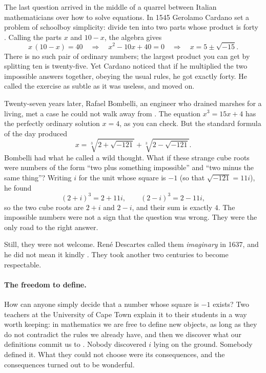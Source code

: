 
The last question arrived in the middle of a quarrel between Italian mathematicians over how to solve equations. In 1545 Gerolamo Cardano set a problem of schoolboy simplicity: divide ten into two parts whose product is forty \citep{Cardano1545}. Calling the parts $x$ and $10 - x$, the algebra gives
\[
x\,(10 - x) = 40 \quad\Longrightarrow\quad x^2 - 10x + 40 = 0 \quad\Longrightarrow\quad x = 5 \pm \sqrt{-15}.
\]
There is no such pair of ordinary numbers; the largest product you can get by splitting ten is twenty-five. Yet Cardano noticed that if he multiplied the two impossible answers together, obeying the usual rules, he got exactly forty. He called the exercise as subtle as it was useless, and moved on.

Twenty-seven years later, Rafael Bombelli, an engineer who drained marshes for a living, met a case he could not walk away from \citep{Bombelli1572}. The equation $x^3 = 15x + 4$ has the perfectly ordinary solution $x = 4$, as you can check. But the standard formula of the day produced
\[
x = \sqrt[3]{2 + \sqrt{-121}} + \sqrt[3]{2 - \sqrt{-121}} .
\]
Bombelli had what he called a wild thought. What if these strange cube roots were numbers of the form ``two plus something impossible'' and ``two minus the same thing''? Writing $i$ for the unit whose square is $-1$ (so that $\sqrt{-121} = 11i$), he found
\[
(2 + i)^3 = 2 + 11i, \qquad (2 - i)^3 = 2 - 11i,
\]
so the two cube roots are $2 + i$ and $2 - i$, and their sum is exactly $4$. The impossible numbers were not a sign that the question was wrong. They were the only road to the right answer.

Still, they were not welcome. René Descartes called them \emph{imaginary} in 1637, and he did not mean it kindly \citep{Descartes1637}. They took another two centuries to become respectable.

\paragraph{The freedom to define.}
How can anyone simply decide that a number whose square is $-1$ exists? Two teachers at the University of Cape Town explain it to their students in a way worth keeping: in mathematics we are free to define new objects, as long as they do not contradict the rules we already have, and then we discover what our definitions commit us to \citep{MokhithiShock2020}. Nobody discovered $i$ lying on the ground. Somebody defined it. What they could not choose were its consequences, and the consequences turned out to be wonderful.

